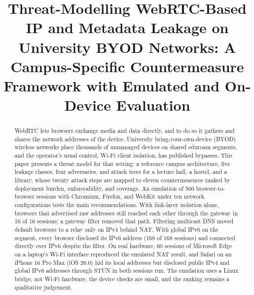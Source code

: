 \documentclass[conference]{IEEEtran}
\begin{document}
\title{Threat-Modelling WebRTC-Based IP and Metadata Leakage on University BYOD Networks: A Campus-Specific Countermeasure Framework with Emulated and On-Device Evaluation}

\author{
\and
{}
\and
{}
}

\maketitle

\begin{abstract}
WebRTC lets browsers exchange media and data directly, and to do so it gathers and shares the network addresses of the device. University bring-your-own-device (BYOD) wireless networks place thousands of unmanaged devices on shared eduroam segments, and the operator's usual control, Wi-Fi client isolation, has published bypasses. This paper presents a threat model for that setting: a reference campus architecture, five leakage classes, four adversaries, and attack trees for a lecture hall, a hostel, and a library, whose twenty attack steps are mapped to eleven countermeasures ranked by deployment burden, enforceability, and coverage. An emulation of 560 browser-to-browser sessions with Chromium, Firefox, and WebKit under ten network configurations tests the main recommendations. With link-layer isolation alone, browsers that advertised raw addresses still reached each other through the gateway in 16 of 16 sessions; a gateway filter removed that path. Filtering multicast DNS moved default browsers to a relay only on IPv4 behind NAT. With global IPv6 on the segment, every browser disclosed its IPv6 address (168 of 168 sessions) and connected directly over IPv6 despite the filter. On real hardware, 60 sessions of Microsoft Edge on a laptop's Wi-Fi interface reproduced the emulated NAT result, and Safari on an iPhone 16 Pro Max (iOS 26.0) hid its local addresses but disclosed public IPv4 and global IPv6 addresses through STUN in both sessions run. The emulation uses a Linux bridge, not Wi-Fi hardware, the device checks are small, and the ranking remains a qualitative judgement.
\end{abstract}
\end{document}

